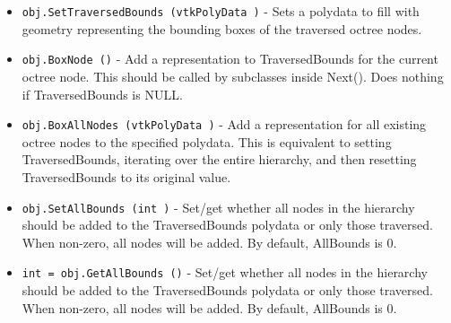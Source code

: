 \begin{itemize}
\item  \verb|obj.SetTraversedBounds (vtkPolyData )| -  Sets a polydata to fill with geometry representing
 the bounding boxes of the traversed octree nodes.

\item  \verb|obj.BoxNode ()| -  Add a representation to TraversedBounds for the current octree node.
 This should be called by subclasses inside Next().
 Does nothing if TraversedBounds is NULL.

\item  \verb|obj.BoxAllNodes (vtkPolyData )| -  Add a representation for all existing octree nodes to the specified polydata.
 This is equivalent to setting TraversedBounds, iterating over the entire hierarchy,
 and then resetting TraversedBounds to its original value.

\item  \verb|obj.SetAllBounds (int )| -  Set/get whether all nodes in the hierarchy should be added to the TraversedBounds
 polydata or only those traversed.
 When non-zero, all nodes will be added.
 By default, AllBounds is 0.

\item  \verb|int = obj.GetAllBounds ()| -  Set/get whether all nodes in the hierarchy should be added to the TraversedBounds
 polydata or only those traversed.
 When non-zero, all nodes will be added.
 By default, AllBounds is 0.

\end{itemize}
